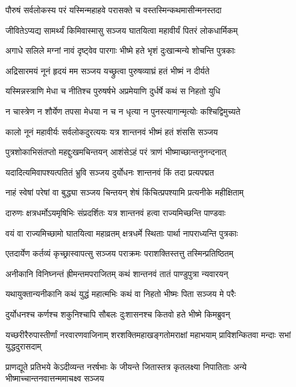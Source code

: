 \twolineshloka
{पौरुषं सर्वलोकस्य परं यस्मिन्महाहवे}
{परासक्ते च वस्तस्मिन्कथमासीन्मनस्तदा}


\twolineshloka
{जीवितेऽप्यद्य सामर्थ्यं किमिवास्मासु सञ्जय}
{घातयित्वा महावीर्यं पितरं लोकधार्मिकम्}


\twolineshloka
{अगाधे सलिले मग्नां नावं दृष्ट्वेव पारगाः}
{भीष्मे हते भृशं दुःखान्मन्ये शोचन्ति पुत्रकाः}


\twolineshloka
{अद्रिसारमयं नूनं हृदयं मम सञ्जय}
{यच्छ्रुत्वा पुरुषव्याघ्रं हतं भीष्मं न दीर्यते}


\twolineshloka
{यस्मिन्नस्त्राणि मेधा च नीतिश्च पुरुषर्षभे}
{अप्रमेयाणि दुर्धर्षे कथं स निहतो युधि}


\twolineshloka
{न चास्त्रेण न शौर्येण तपसा मेधया न च}
{न धृत्या न पुनस्त्यागान्मृत्योः कश्चिद्विमुच्यते}


\twolineshloka
{कालो नूनं महावीर्यः सर्वलोकदुरत्ययः}
{यत्र शान्तनवं भीष्मं हतं शंससि सञ्जय}


\twolineshloka
{पुत्रशोकाभिसंतप्तो महद्दुःखमचिन्तयन्}
{आशंसेऽहं परं त्राणं भीष्माच्छान्तनुनन्दनात्}


\twolineshloka
{यदादित्यमिवापश्यत्पतितं भ्रुवि सञ्जय}
{दुर्योधनः शान्तनवं किं तदा प्रत्यपद्मत}


\twolineshloka
{नाहं स्वेषां परेषां वा बुद्ध्या सञ्जय चिन्तयन्}
{शेषं किंचित्प्रपश्यामि प्रत्यनीके महीक्षिताम्}


\twolineshloka
{दारुणः क्षत्रधर्मोऽयमृषिभिः संप्रदर्शितः}
{यत्र शान्तनवं हत्वा राज्यमिच्छन्ति पाण्डवाः}


\twolineshloka
{वयं वा राज्यमिच्छामो घातयित्वा महाव्रतम्}
{क्षत्रधर्मे स्थिताः पार्था नापराध्यन्ति पुत्रकाः}


\twolineshloka
{एतदार्येण कर्तव्यं कृच्छ्रास्वापत्सु सञ्जय}
{पराक्रमः पराशक्तिस्तत्तु तस्मिन्प्रतिष्ठितम्}


\twolineshloka
{अनीकानि विनिघ्नन्तं ह्रीमन्तमपराजितम्}
{कथं शान्तनवं तातं पाण्डुपुत्रा न्यवारयन्}


\twolineshloka
{यथायुक्तान्यनीकानि कथं युद्धं महात्मभिः}
{कथं वा निहतो भीष्मः पिता सञ्जय मे परैः}


\twolineshloka
{दुर्योधनश्च कर्णश्च शकुनिश्चापि सौबलः}
{दुःशासनश्च कितवो हते भीष्मे किमब्रुवन्}


\threelineshloka
{यच्छरीरैरुपास्तीर्णां नरवारणवाजिनाम्}
{शरशक्तिमहाखङ्गतोमराक्षां महाभयाम्}
{प्राविशन्कितवा मन्दाः सभां युद्धदुरासदाम्}


\threelineshloka
{प्राणद्यूते प्रतिभये केऽदीव्यन्त नरर्षभाः}
{के जीयन्ते जितास्तत्र कृतलक्ष्या निपातिताः}
{अन्ये भीष्माच्चान्तनवात्तन्ममाचक्ष्व सञ्जय}


